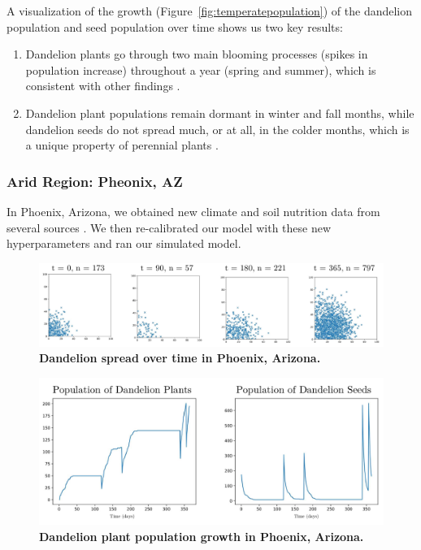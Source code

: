 A visualization of the growth (Figure~\ref{fig:temperatepopulation}) of the dandelion population and seed population over time shows us two key results:

\begin{enumerate}
    \item Dandelion plants go through two main blooming processes (spikes in population increase) throughout a year (spring and summer), which is consistent with other findings \cite{noauthor_dandelion_nodate-2}.
    \item Dandelion plant populations remain dormant in winter and fall months, while dandelion seeds do not spread much, or at all, in the colder months, which is a unique property of perennial plants \cite{noauthor_dandelion_nodate-2}.
\end{enumerate}

\subsubsection{Arid Region: Pheonix, AZ}

In Phoenix, Arizona, we obtained new climate and soil nutrition data from several sources \cite{arizona_guide_nodate, ottman_arizona_nodate, noauthor_average_nodate}. We then re-calibrated our model with these new hyperparameters and ran our simulated model.

\begin{figure}[h!]
\centering
    \includegraphics[scale=0.6]{figures/arizonaspread.pdf}
    \captionsetup{width=0.9\textwidth}
    \caption{\textbf{Dandelion spread over time in Phoenix, Arizona.}}
    \label{fig:arizonaspread}
\end{figure}

\begin{figure}[h!]
\centering
    \includegraphics[scale=0.5]{figures/arizonapopulation.pdf}
    \captionsetup{width=0.9\textwidth}
    \caption{\textbf{Dandelion plant population growth in Phoenix, Arizona.}}
    \label{fig:arizonapopulation}
\end{figure}

